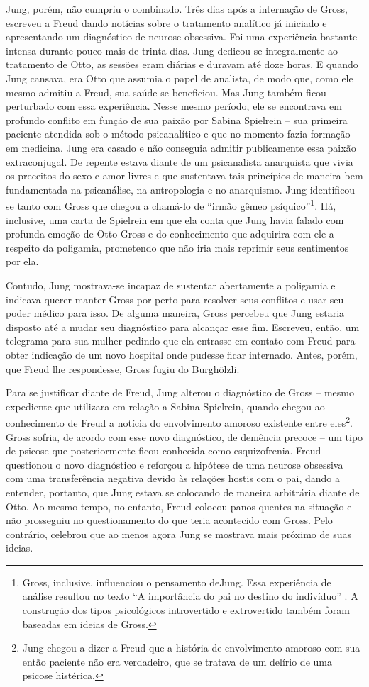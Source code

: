 Jung, porém, não cumpriu o combinado. Três dias após a internação de
Gross, escreveu a Freud dando notícias sobre o tratamento analítico já
iniciado e apresentando um diagnóstico de neurose obsessiva. Foi uma
experiência bastante intensa durante pouco mais de trinta dias. Jung
dedicou-se integralmente ao tratamento de Otto, as sessões eram diárias
e duravam até doze horas. E quando Jung cansava, era Otto que assumia o
papel de analista, de modo que, como ele mesmo admitiu a Freud, sua
saúde se beneficiou. Mas Jung também ficou perturbado com essa
experiência. Nesse mesmo período, ele se encontrava em profundo conflito
em função de sua paixão por Sabina Spielrein -- sua primeira paciente
atendida sob o método psicanalítico e que no momento fazia formação em
medicina. Jung era casado e não conseguia admitir publicamente essa
paixão extraconjugal. De repente estava diante de um psicanalista
anarquista que vivia os preceitos do sexo e amor livres e que sustentava
tais princípios de maneira bem fundamentada na psicanálise, na
antropologia e no anarquismo. Jung identificou-se tanto com Gross que
chegou a chamá-lo de ``irmão gêmeo psíquico''\footnote{Gross, inclusive,
  influenciou o pensamento deJung. Essa experiência de análise resultou
  no texto ``A importância do pai no destino do indivíduo'' . A
  construção dos tipos psicológicos introvertido e extrovertido também
  foram baseadas em ideias de Gross.}. Há, inclusive, uma carta de
Spielrein em que ela conta que Jung havia falado com profunda emoção de
Otto Gross e do conhecimento que adquirira com ele a respeito da
poligamia, prometendo que não iria mais reprimir seus sentimentos por
ela.

Contudo, Jung mostrava-se incapaz de sustentar abertamente a poligamia e
indicava querer manter Gross por perto para resolver seus conflitos e
usar seu poder médico para isso. De alguma maneira, Gross percebeu que
Jung estaria disposto até a mudar seu diagnóstico para alcançar esse
fim. Escreveu, então, um telegrama para sua mulher pedindo que ela
entrasse em contato com Freud para obter indicação de um novo hospital
onde pudesse ficar internado. Antes, porém, que Freud lhe respondesse,
Gross fugiu do Burghölzli.

Para se justificar diante de Freud, Jung alterou o diagnóstico de Gross
-- mesmo expediente que utilizara em relação a Sabina Spielrein, quando
chegou ao conhecimento de Freud a notícia do envolvimento amoroso
existente entre eles\footnote{Jung chegou a dizer a Freud que a história
  de envolvimento amoroso com sua então paciente não era verdadeiro, que
  se tratava de um delírio de uma psicose histérica.}. Gross sofria, de
acordo com esse novo diagnóstico, de demência precoce -- um tipo de
psicose que posteriormente ficou conhecida como esquizofrenia. Freud
questionou o novo diagnóstico e reforçou a hipótese de uma neurose
obsessiva com uma transferência negativa devido às relações hostis com o
pai, dando a entender, portanto, que Jung estava se colocando de maneira
arbitrária diante de Otto. Ao mesmo tempo, no entanto, Freud colocou
panos quentes na situação e não prosseguiu no questionamento do que
teria acontecido com Gross. Pelo contrário, celebrou que ao menos agora
Jung se mostrava mais próximo de suas ideias.

